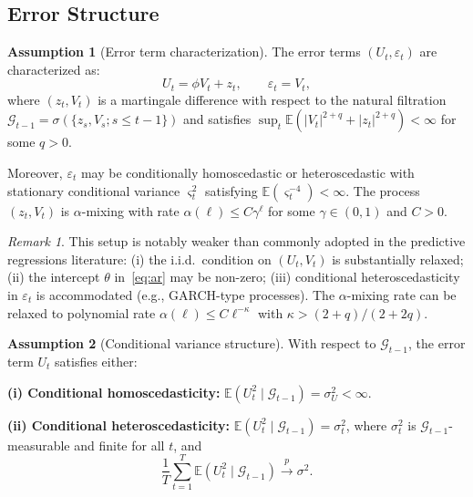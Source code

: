 \documentclass[11pt,a4paper]{article}
\theoremstyle{definition}
\newtheorem{assumption}{Assumption}[section]
\theoremstyle{remark}
\newtheorem{remark}{Remark}[section]
\begin{document}
\subsection{Error Structure}

\begin{assumption}[Error term characterization]\label{asm:errors}
The error terms $(U_t, \varepsilon_t)$ are characterized as:
\begin{equation}\label{eq:error_struct}
    U_t = \phi V_t + z_t, \qquad \varepsilon_t = V_t,
\end{equation}
where $(z_t, V_t)$ is a martingale difference with respect to the natural filtration
$\mathcal{G}_{t-1} = \sigma(\{z_s, V_s; s \leq t-1\})$ and satisfies
$\sup_t \mathbb{E}(|V_t|^{2+q} + |z_t|^{2+q}) < \infty$ for some $q > 0$.

Moreover, $\varepsilon_t$ may be conditionally homoscedastic or heteroscedastic
with stationary conditional variance $\varsigma_t^2$ satisfying
$\mathbb{E}(\varsigma_t^{-4}) < \infty$.
The process $(z_t, V_t)$ is $\alpha$-mixing with rate
$\alpha(\ell) \leq C\gamma^\ell$ for some $\gamma \in (0,1)$ and $C > 0$.
\end{assumption}

\begin{remark}
This setup is notably weaker than commonly adopted in the predictive regressions literature:
(i) the i.i.d.\ condition on $(U_t, V_t)$ is substantially relaxed;
(ii) the intercept $\theta$ in~\eqref{eq:ar} may be non-zero;
(iii) conditional heteroscedasticity in $\varepsilon_t$ is accommodated (e.g., GARCH-type processes).
The $\alpha$-mixing rate can be relaxed to polynomial rate
$\alpha(\ell) \leq C\ell^{-\kappa}$ with $\kappa > (2+q)/(2+2q)$.
\end{remark}

\begin{assumption}[Conditional variance structure]\label{asm:variance}
With respect to $\mathcal{G}_{t-1}$, the error term $U_t$ satisfies either:

\smallskip
\noindent\textbf{(i) Conditional homoscedasticity:}
$\mathbb{E}(U_t^2 \mid \mathcal{G}_{t-1}) = \sigma_U^2 < \infty$.

\smallskip
\noindent\textbf{(ii) Conditional heteroscedasticity:}
$\mathbb{E}(U_t^2 \mid \mathcal{G}_{t-1}) = \sigma_t^2$, where $\sigma_t^2$ is
$\mathcal{G}_{t-1}$-measurable and finite for all $t$, and
\begin{equation}
    \frac{1}{T}\sum_{t=1}^T \mathbb{E}(U_t^2 \mid \mathcal{G}_{t-1}) \xrightarrow{p} \sigma^2.
\end{equation}
\end{assumption}
\end{document}
